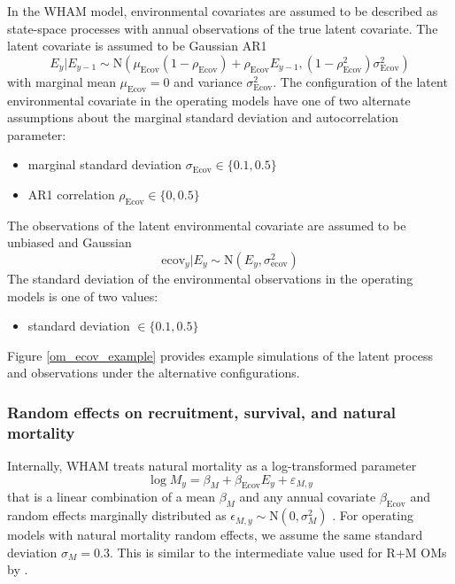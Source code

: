 \documentclass[
  12pt,
]{article}
\begin{document}
In the WHAM model, environmental covariates are assumed to be described as state-space processes with annual observations of the true latent covariate. The latent covariate is assumed to be Gaussian AR1
\[
E_y|E_{y-1} \sim \text{N}\left(\mu_\text{Ecov}\left(1-\rho_\text{Ecov}\right) + \rho_\text{Ecov} E_{y-1}, \left(1-\rho_\text{Ecov}^2\right)\sigma^2_\text{Ecov}\right)
\]
with marginal mean \(\mu_\text{Ecov}=0\) and variance \(\sigma^2_\text{Ecov}\). The configuration of the latent environmental covariate in the operating models have one of two alternate assumptions about the marginal standard deviation and autocorrelation parameter:

\begin{itemize}
\item marginal standard deviation $\sigma_\text{Ecov} \in \{0.1, 0.5\}$
\item AR1 correlation $\rho_\text{Ecov} \in \{0, 0.5\}$
\end{itemize}

The observations of the latent environmental covariate are assumed to be unbiased and Gaussian
\[
\text{ecov}_y|E_y \sim \text{N}\left(E_y,\sigma^2_\text{ecov}\right)
\]
The standard deviation of the environmental observations in the operating models is one of two values:

\begin{itemize}
\item standard deviation $\in \{0.1, 0.5\}$
\end{itemize}

Figure \ref{om_ecov_example} provides example simulations of the latent process and observations under the alternative configurations.

\hypertarget{random-effects-on-recruitment-survival-and-natural-mortality}{%
\subsubsection*{Random effects on recruitment, survival, and natural mortality}\label{random-effects-on-recruitment-survival-and-natural-mortality}}

Internally, WHAM treats natural mortality as a log-transformed parameter
\[
\log M_y = \beta_M + \beta_{\text{Ecov}} E_y + \varepsilon_{M,y}
\]
that is a linear combination of a mean \(\beta_M\) and any annual covariate \(\beta_{\text{Ecov}}\) and random effects marginally distributed as \(\epsilon_{M,y} \sim \text{N}\left(0,\sigma_M^2\right)\) \citep{stockmiller21}. For operating models with natural mortality random effects, we assume the same standard deviation \(\sigma_M = 0.3\). This is similar to the intermediate value used for R+M OMs by \citet{milleretal_inreview1}.
\end{document}
